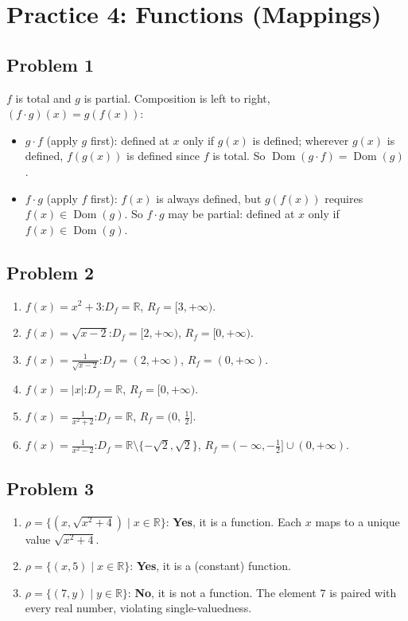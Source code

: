 \section*{Practice 4: Functions (Mappings)}

\subsection*{Problem 1}
$f$ is total and $g$ is partial. Composition is left to right, $(f\cdot g)(x)=g(f(x))$:
\begin{itemize}[nosep]
  \item $g\cdot f$ (apply $g$ first): defined at $x$ only if $g(x)$ is defined; wherever $g(x)$ is defined, $f(g(x))$ is defined since $f$ is total. So $\operatorname{Dom}(g\cdot f)=\operatorname{Dom}(g)$.
  \item $f\cdot g$ (apply $f$ first): $f(x)$ is always defined, but $g(f(x))$ requires $f(x)\in\operatorname{Dom}(g)$. So $f\cdot g$ may be partial: defined at $x$ only if $f(x)\in\operatorname{Dom}(g)$.
\end{itemize}

\subsection*{Problem 2}
\begin{enumerate}[label=(\alph*), nosep]
  \item $f(x)=x^2+3$:\quad $D_f = \mathbb{R}$,\; $R_f = [3,+\infty)$.
  \item $f(x)=\sqrt{x-2}$:\quad $D_f = [2,+\infty)$,\; $R_f = [0,+\infty)$.
  \item $f(x)=\frac{1}{\sqrt{x-2}}$:\quad $D_f = (2,+\infty)$,\; $R_f = (0,+\infty)$.
  \item $f(x)=|x|$:\quad $D_f = \mathbb{R}$,\; $R_f = [0,+\infty)$.
  \item $f(x)=\frac{1}{x^2+2}$:\quad $D_f = \mathbb{R}$,\; $R_f = \bigl(0,\,\tfrac{1}{2}\bigr]$.
  \item $f(x)=\frac{1}{x^2-2}$:\quad $D_f = \mathbb{R}\setminus\{-\sqrt{2},\sqrt{2}\}$,\; $R_f = \bigl(-\infty,-\tfrac{1}{2}\bigr]\cup(0,+\infty)$.
\end{enumerate}

\subsection*{Problem 3}
\begin{enumerate}[label=(\alph*), nosep]
  \item $\rho = \{(x,\sqrt{x^2+4}) \mid x\in\mathbb{R}\}$: \textbf{Yes}, it is a function. Each $x$ maps to a unique value $\sqrt{x^2+4}$.
  \item $\rho = \{(x,5) \mid x\in\mathbb{R}\}$: \textbf{Yes}, it is a (constant) function.
  \item $\rho = \{(7,y) \mid y\in\mathbb{R}\}$: \textbf{No}, it is not a function. The element $7$ is paired with every real number, violating single-valuedness.
\end{enumerate}

